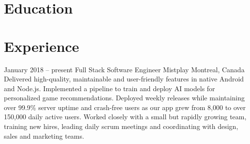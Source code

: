 \documentclass[10pt,a4paper,sans]{moderncv} %
\newcommand{\vs}[0]{\smallskip}
\begin{document}
\makecvtitle %
\par
\vspace{-6ex}


\section{Education}

\renewcommand{\listitemsymbol}{-~} %

\vs
{}



\section{Experience}



\cventry
{January 2018 -- present}
{Full Stack Software Engineer}
{{Mistplay}}
{Montreal, Canada}
{}{Delivered high-quality, maintainable and user-friendly features in native Android and Node.js. Implemented a pipeline to train and deploy AI models for personalized game recommendations. Deployed weekly releases while maintaining over 99.9\% server uptime and crash-free users as our app grew from 8,000 to over 150,000 daily active users. Worked closely with a small but rapidly growing team, training new hires, leading daily scrum meetings and coordinating with design, sales and marketing teams.
}\vs
\end{document}
